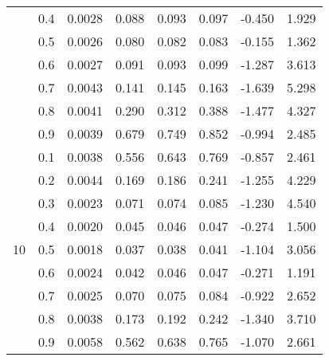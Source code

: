 \documentclass[11pt,a4paper]{report}
\begin{document}
\begin{longtable}{ | c | c || c | c | c | c | c | c | }
 & 0.4 & 0.0028 & 0.088 & 0.093 & 0.097 & -0.450 & 1.929 \\
 & 0.5 & 0.0026 & 0.080 & 0.082 & 0.083 & -0.155 & 1.362 \\
 & 0.6 & 0.0027 & 0.091 & 0.093 & 0.099 & -1.287 & 3.613 \\
 & 0.7 & 0.0043 & 0.141 & 0.145 & 0.163 & -1.639 & 5.298 \\
 & 0.8 & 0.0041 & 0.290 & 0.312 & 0.388 & -1.477 & 4.327 \\
 & 0.9 & 0.0039 & 0.679 & 0.749 & 0.852 & -0.994 & 2.485 \\
 \hline
\multirow{9}{*}{10} & 0.1 & 0.0038 & 0.556 & 0.643 & 0.769 & -0.857 & 2.461 \\
 & 0.2 & 0.0044 & 0.169 & 0.186 & 0.241 & -1.255 & 4.229 \\
 & 0.3 & 0.0023 & 0.071 & 0.074 & 0.085 & -1.230 & 4.540 \\
 & 0.4 & 0.0020 & 0.045 & 0.046 & 0.047 & -0.274 & 1.500 \\
 & 0.5 & 0.0018 & 0.037 & 0.038 & 0.041 & -1.104 & 3.056 \\
 & 0.6 & 0.0024 & 0.042 & 0.046 & 0.047 & -0.271 & 1.191 \\
 & 0.7 & 0.0025 & 0.070 & 0.075 & 0.084 & -0.922 & 2.652 \\
 & 0.8 & 0.0038 & 0.173 & 0.192 & 0.242 & -1.340 & 3.710 \\
 & 0.9 & 0.0058 & 0.562 & 0.638 & 0.765 & -1.070 & 2.661 \\
 \hline
\hline
\end{longtable}
\end{document}
